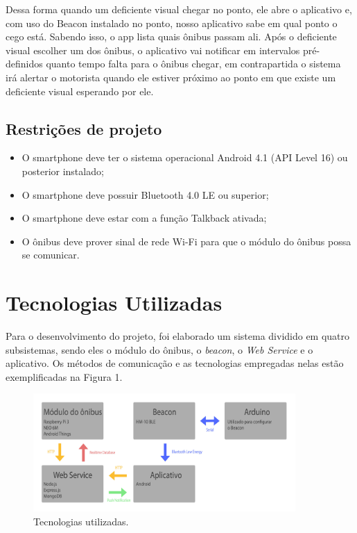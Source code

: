 \documentclass[
	12pt,				%
	oneside,			%
	a4paper,			%
	brazil				%
]{abntex2}
\begin{document}
Dessa forma quando um deficiente visual chegar no ponto, ele abre o aplicativo e, com uso do Beacon instalado no ponto, nosso aplicativo sabe em qual ponto o cego está. Sabendo isso, o app lista quais ônibus passam ali. Após o deficiente visual escolher um dos ônibus, o aplicativo vai notificar em intervalos pré-definidos quanto tempo falta para o ônibus chegar, em contrapartida o sistema irá alertar o motorista quando ele estiver próximo ao ponto em que existe um deficiente visual esperando por ele.

\section{Restrições de projeto}

\begin{itemize}
\item O smartphone deve ter o sistema operacional Android 4.1 (API Level 16) ou posterior instalado;
\item O smartphone deve possuir Bluetooth 4.0 LE ou superior;
\item O smartphone deve estar com a função Talkback ativada;
\item O ônibus deve prover sinal de rede Wi-Fi para que o módulo do ônibus possa se comunicar.
\end{itemize}

\chapter{Tecnologias Utilizadas}

Para o desenvolvimento do projeto, foi elaborado um sistema dividido em quatro subsistemas, sendo eles o módulo do ônibus, o \textit{beacon}, o \textit{Web Service} e o aplicativo. Os métodos de comunicação e as tecnologias empregadas nelas estão exemplificadas na Figura 1. 

\begin{figure}[H]
\centering
\includegraphics[width=10cm, center]{images/tech}
\caption{Tecnologias utilizadas.}
\label{tecnolgias}
\end{figure}
\end{document}
